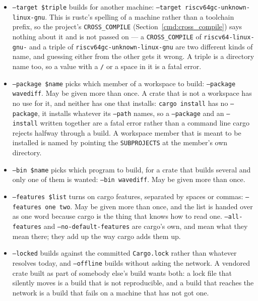 \documentclass{article}
\begin{document}
\begin{itemize}
\item \texttt{--target \$triple} builds for another machine:
  \texttt{--target riscv64gc-unknown-linux-gnu}.  This is rustc's
  spelling of a machine rather than a toolchain prefix, so the
  project's \texttt{CROSS\_COMPILE} (Section~\ref{cmd:cross_compile})
  says nothing about it and is not passed on ---
  a \texttt{CROSS\_COMPILE} of
  \texttt{riscv64-linux-gnu-} and a triple of
  \texttt{riscv64gc-unknown-linux-gnu} are two different kinds of
  name, and guessing either from the other gets it wrong.  A triple is a
  directory name too, so a value with a \texttt{/} or a space in it is
  a fatal error.

\item \texttt{--package \$name} picks which member of a workspace to
  build: \texttt{--package wavediff}.  May be given more than once.  A
  crate that is not a workspace has no use for it, and neither has one
  that installs: \texttt{cargo install} has no \texttt{--package}, it
  installs whatever its \texttt{--path} names, so a \texttt{--package}
  and an \texttt{--install} written together are a fatal error rather
  than a command line cargo rejects halfway through a build.  A
  workspace member that is meant to be installed is named by pointing
  the \texttt{SUBPROJECTS} at the member's own directory.

\item \texttt{--bin \$name} picks which program to build, for a crate
  that builds several and only one of them is wanted:
  \texttt{--bin wavediff}.  May be given more than once.

\item \texttt{--features \$list} turns on cargo features, separated by
  spaces or commas: \texttt{--features one two}.  May be given more
  than once, and the list is handed over as one word because cargo is
  the thing that knows how to read one.  \texttt{--all-features} and
  \texttt{--no-default-features} are cargo's own, and mean what they
  mean there; they add up the way cargo adds them up.

\item \texttt{--locked} builds against the committed
  \texttt{Cargo.lock} rather than whatever resolves today, and
  \texttt{--offline} builds without asking the network.  A vendored
  crate built as part of somebody else's build wants both: a lock file
  that silently moves is a build that is not reproducible, and a build
  that reaches the network is a build that fails on a machine that has
  not got one.


\end{itemize}
\end{document}
